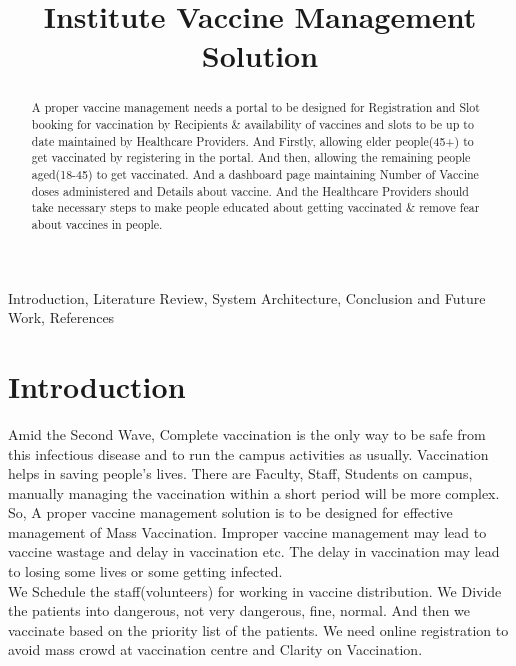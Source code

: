\documentclass[conference]{IEEEtran}
\begin{document}
\title{Institute Vaccine Management Solution\\}

\author{
}

\maketitle

\begin{abstract}
A proper vaccine management needs a portal to be designed for Registration and Slot booking for vaccination by Recipients \& availability of vaccines and slots to be up to date maintained by Healthcare Providers. And Firstly, allowing elder people(45+) to get vaccinated by registering in the portal. And then, allowing the remaining people aged(18-45) to get vaccinated. And a dashboard page maintaining Number of Vaccine doses administered and Details about vaccine. And the Healthcare Providers should take necessary steps to make people educated about getting vaccinated \& remove fear about vaccines in people.
\end{abstract}

\begin{IEEEkeywords}
Introduction, Literature Review, System Architecture, Conclusion and Future Work, References
\end{IEEEkeywords}

\section{Introduction}
Amid the Second Wave, Complete vaccination is the only way to be safe from this infectious disease and to run the campus activities as usually. Vaccination helps in saving people's lives. There are Faculty, Staff, Students on campus, manually managing the vaccination within a short period will be more complex. So, A proper vaccine management solution is to be designed for effective management of Mass Vaccination. Improper vaccine management may lead to vaccine wastage and delay in vaccination etc. The delay in vaccination may lead to losing some lives or some getting infected.
\\
We Schedule the staff(volunteers) for working in vaccine distribution. We Divide the patients into dangerous, not very dangerous, fine, normal. And then we vaccinate based on the priority list of the patients. We need online registration to avoid mass crowd at vaccination centre and Clarity on Vaccination.
\end{document}
